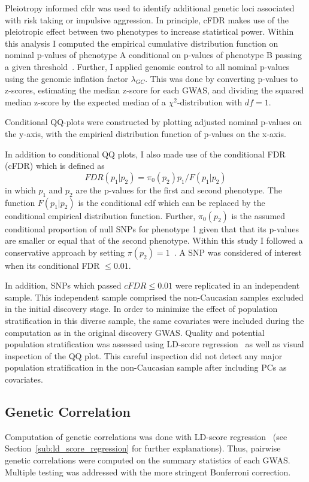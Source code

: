 Pleiotropy informed \acrfull{cfdr} was used to identify additional genetic loci associated with risk taking or impulsive aggression. 
In principle, cFDR makes use of the pleiotropic effect between two phenotypes to increase statistical power.
Within this analysis I computed the empirical cumulative distribution function on nominal p-values of phenotype A conditional on p-values of phenotype B passing a given threshold~\cite{Andreassen2013}.
Further, I applied genomic control to all nominal p-values using the genomic inflation factor $\lambda_{GC}$.
This was done by converting p-values to z-scores, estimating the median z-score for each GWAS, and dividing the squared median z-score by the expected median of a $\chi^2$-distribution  with $df=1$.

Conditional QQ-plots were constructed by plotting adjusted nominal p-values on the y-axis, with the empirical distribution function of p-values on the x-axis.

In addition to conditional QQ plots, I also made use of the conditional FDR (cFDR) which is defined as~\cite{Andreassen2013}
\begin{equation}
  FDR(p_1|p_2)=\pi_0(p_2)p_1/F(p_1|p_2)
\end{equation}
in which $p_1$ and $p_2$ are the p-values for the first and second phenotype.
The function $F(p_1|p_2)$ is the conditional cdf which can be replaced by the conditional empirical distribution function.
Further, $\pi_0(p_2)$ is the assumed conditional proportion of null SNPs for phenotype 1 given that that its p-values are smaller or equal that of the second phenotype.
Within this study I followed a conservative approach by setting $\pi(p_2)=1$~\cite{Andreassen2013}.
A SNP was considered of interest when its conditional FDR $\leq 0.01$.

In addition, SNPs which passed $cFDR\leq 0.01$ were replicated in an independent sample.
This independent sample comprised the non-Caucasian samples excluded in the initial discovery stage.
In order to minimize the effect of population stratification in this diverse sample, the same covariates were included during the computation as in the original discovery GWAS\@.
Quality and potential population stratification was assessed using LD-score regression~\cite{Bulik-Sullivan2015b} as well as visual inspection of the QQ plot.
This careful inspection did not detect any major population stratification in the non-Caucasian sample after including PCs as covariates.

\subsection{Genetic Correlation}
\label{sub:genetic_correlation_ukb_assoc}

Computation of genetic correlations was done with LD-score regression~\cite{Bulik-Sullivan2015b,Bulik-Sullivan2015a} (see Section~\ref{sub:ld_score_regression} for further explanations).
Thus, pairwise genetic correlations were computed on the summary statistics of each GWAS\@.
Multiple testing was addressed with the more stringent Bonferroni correction.

